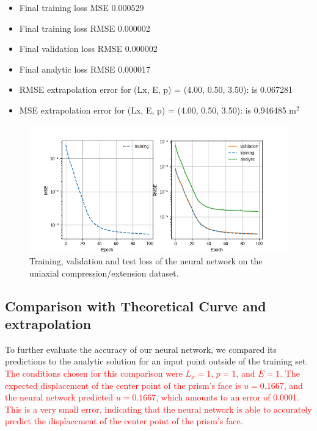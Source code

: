 \documentclass[11pt]{scrartcl} %
\begin{document}
\begin{itemize}
\item Final training loss MSE 0.000529  
\item  Final training loss RMSE 0.000002  
\item Final validation loss RMSE 0.000002  
\item  Final analytic loss RMSE 0.000017  
\item RMSE extrapolation error for (Lx, E, p) = (4.00, 0.50, 3.50): is 0.067281
\item MSE extrapolation error for (Lx, E, p) = (4.00, 0.50, 3.50): is 0.946485 m$^2$
\end{itemize}





\begin{figure}[h]
\centering
\includegraphics[width=1\textwidth]{Figures/Example1_losses.png}
\caption{Training, validation and test loss of the neural network on the uniaxial compression/extension dataset.}
\label{fig:train_loss}
\end{figure}

\subsection{Comparison with Theoretical Curve and extrapolation}
To further evaluate the accuracy of our neural network, we compared its predictions to the analytic solution for an input point outside of the training set. \textcolor{red}{The conditions chosen for this comparison were $L_x = 1$, $p = 1$, and $E = 1$. The expected displacement of the center point of the prism's face is $u = 0.1667$, and the neural network predicted $u = 0.1667$, which amounts to an error of 0.0001. This is a very small error, indicating that the neural network is able to accurately predict the displacement of the center point of the prism's face.}
\end{document}
